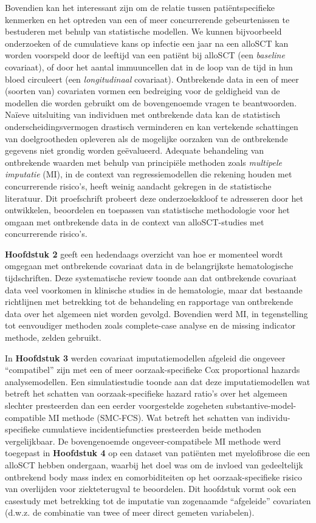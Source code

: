 \documentclass[
  letterpaper,
  paper=240mm:170mm,
  twoside=true,
  open=right,
  fontsize=10pt,
  pagesize=false,
  BCOR=15mm,
  DIV=14,
  headinclude=true,
  footinclude=false,
  headsepline=on]{scrbook}
\begin{document}
Bovendien kan het interessant zijn om de relatie tussen
patiëntspecifieke kenmerken en het optreden van een of meer
concurrerende gebeurtenissen te bestuderen met behulp van statistische
modellen. We kunnen bijvoorbeeld onderzoeken of de cumulatieve kans op
infectie een jaar na een alloSCT kan worden voorspeld door de leeftijd
van een patiënt bij alloSCT (een \emph{baseline} covariaat), of door het
aantal immuuncellen dat in de loop van de tijd in hun bloed circuleert
(een \emph{longitudinaal} covariaat). Ontbrekende data in een of meer
(soorten van) covariaten vormen een bedreiging voor de geldigheid van de
modellen die worden gebruikt om de bovengenoemde vragen te beantwoorden.
Naïeve uitsluiting van individuen met ontbrekende data kan de
statistisch onderscheidingsvermogen drastisch verminderen en kan
vertekende schattingen van doelgrootheden opleveren als de mogelijke
oorzaken van de ontbrekende gegevens niet grondig worden geëvalueerd.
Adequate behandeling van ontbrekende waarden met behulp van principiële
methoden zoals \emph{multipele imputatie} (MI), in de context van
regressiemodellen die rekening houden met concurrerende risico's, heeft
weinig aandacht gekregen in de statistische literatuur. Dit proefschrift
probeert deze onderzoekskloof te adresseren door het ontwikkelen,
beoordelen en toepassen van statistische methodologie voor het omgaan
met ontbrekende data in de context van alloSCT-studies met concurrerende
risico's.

\textbf{Hoofdstuk 2} geeft een hedendaags overzicht van hoe er momenteel
wordt omgegaan met ontbrekende covariaat data in de belangrijkste
hematologische tijdschriften. Deze systematische review toonde aan dat
ontbrekende covariaat data veel voorkomen in klinische studies in de
hematologie, maar dat bestaande richtlijnen met betrekking tot de
behandeling en rapportage van ontbrekende data over het algemeen niet
worden gevolgd. Bovendien werd MI, in tegenstelling tot eenvoudiger
methoden zoals complete-case analyse en de missing indicator methode,
zelden gebruikt.

In \textbf{Hoofdstuk 3} werden covariaat imputatiemodellen afgeleid die
ongeveer ``compatibel'' zijn met een of meer oorzaak-specifieke Cox
proportional hazards analysemodellen. Een simulatiestudie toonde aan dat
deze imputatiemodellen wat betreft het schatten van oorzaak-specifieke
hazard ratio's over het algemeen slechter presteerden dan een eerder
voorgestelde zogeheten substantive-model-compatible MI methode
(SMC-FCS). Wat betreft het schatten van individu-specifieke cumulatieve
incidentiefuncties presteerden beide methoden vergelijkbaar. De
bovengenoemde ongeveer-compatibele MI methode werd toegepast in
\textbf{Hoofdstuk 4} op een dataset van patiënten met myelofibrose die
een alloSCT hebben ondergaan, waarbij het doel was om de invloed van
gedeeltelijk ontbrekend body mass index en comorbiditeiten op het
oorzaak-specifieke risico van overlijden voor ziekteterugval te
beoordelen. Dit hoofdstuk vormt ook een casestudy met betrekking tot de
imputatie van zogenaamde ``afgeleide'' covariaten (d.w.z. de combinatie
van twee of meer direct gemeten variabelen).
\end{document}
